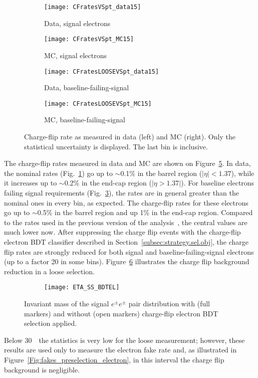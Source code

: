 \begin{figure}[t!]
\centering
\begin{subfigure}[b]{0.45\textwidth}
	\texttt{[image: CFratesVSpt\_data15]}
	\caption{Data, signal electrons}\label{fig:Chflip_nominalData}
\end{subfigure}
\begin{subfigure}[b]{0.45\textwidth}
	\texttt{[image: CFratesVSpt\_MC15]}
	\caption{MC, signal electrons}\label{fig:Chflip_nominalMC}
\end{subfigure}
\begin{subfigure}[b]{0.45\textwidth}
	\texttt{[image: CFratesLOOSEVSpt\_data15]}
	\caption{Data, baseline-failing-signal}\label{fig:Chflip_looseData}
\end{subfigure}
\begin{subfigure}[b]{0.45\textwidth}
	\texttt{[image: CFratesLOOSEVSpt\_MC15]}
	\caption{MC, baseline-failing-signal}\label{fig:Chflip_looseMC}
\end{subfigure}
\caption{Charge-flip rate as measured in data (left) and MC (right). 
Only the statistical uncertainty is displayed. The last \pt bin is inclusive.}
\label{fig:ChFlip_Rate}
\end{figure}

The charge-flip rates measured in data and MC are shown on Figure~\ref{fig:ChFlip_Rate}. 
 In data, the nominal rates (Fig.~\ref{fig:Chflip_nominalData}) go up to $\sim$0.1\% in the barrel region ($|\eta| < 1.37$), 
 while it increases up to $\sim$0.2\% in the end-cap region ($|\eta > 1.37|$). 
 For baseline electrons failing signal requirements (Fig.~\ref{fig:Chflip_looseData}), 
 the rates are in general greater than the nominal ones in every bin, as expected. The charge-flip rates for these electrons go up to $\sim$0.5\% in the barrel region and up 1\% in the end-cap region. Compared to the rates used in the previous version of the analysis~\cite{ATLAS-CONF-2016-037}, the central values are much lower now. After suppressing the charge flip events with the charge-flip 
electron BDT classifier described in Section~\ref{subsec:strategy.sel.obj}, 
the charge flip rates are strongly reduced for both signal and baseline-failing-signal electrons (up to a factor 20 in some bins). Figure~\ref{fig:ETA_SS_BDTEL}
illustrates the charge flip background reduction in a loose selection.
\begin{figure}[htb!]
\centering
\begin{subfigure}[t]{0.66\textwidth}\texttt{[image: ETA\_SS\_BDTEL]}\end{subfigure}
\caption{Invariant mass of the signal $e^{\pm} e^{\pm}$ pair distribution with (full markers) and without (open markers) charge-flip electron BDT selection applied.
}
\label{fig:ETA_SS_BDTEL}
\end{figure}
Below 30~\GeV\, the statistics is very low for the loose measurement; however, these results are used only to measure the electron fake rate and, as illustrated in Figure~\ref{Fig:fakes_preselection_electron}, in this \pt interval the charge flip background is negligible.

